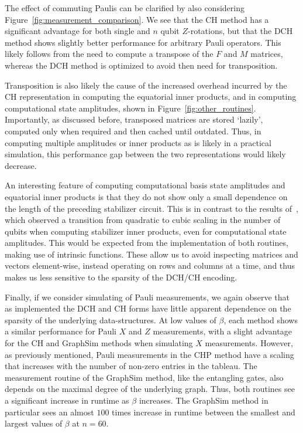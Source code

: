 The effect of commuting Paulis can be clarified by also considering Figure~\ref{fig:measurement_comparison}. We see that the CH method has a significant advantage for both single and $n$ qubit $Z$-rotations, but that the DCH method shows slightly better performance for arbitrary Pauli operators. This likely follows from the need to compute a transpose of the $F$ and $M$ matrices, whereas the DCH method is optimized to avoid then need for transposition.\par
Transposition is also likely the cause of the increased overhead incurred by the CH representation in computing the equatorial inner products, and in computing computational state amplitudes, shown in Figure~\ref{fig:other_routines}. Importantly, as discussed before, transposed matrices are stored `lazily', computed only when required and then cached until outdated. Thus, in computing multiple amplitudes or inner products as is likely in a practical simulation, this performance gap between the two representations would likely decrease.\par
An interesting feature of computing computational basis state amplitudes and equatorial inner products is that they do not show only a small dependence on the length of the preceding stabilizer circuit. This is in contrast to the results of~\cite{Garcia2012}, which observed a transition from quadratic to cubic scaling in the number of qubits when computing stabilizer inner products, even for computational state amplitudes. This would be expected from the implementation of both routines, making use of intrinsic functions. These allow us to avoid inspecting matrices and vectors element-wise, instead operating on rows and columns at a time, and thus makes us less sensitive to the sparsity of the DCH/CH encoding.\par 
Finally, if we consider simulating of Pauli measurements, we again observe that as implemented the DCH and CH forms have little apparent dependence on the sparsity of the underlying data-structures. At low values of $\beta$, each method shows a similar performance for Pauli $X$ and $Z$ measurements, with a slight advantage for the CH and GraphSim methods when simulating $X$ measurements. However, as previously mentioned, Pauli measurements in the CHP method have a scaling that increases with the number of non-zero entries in the tableau. The measurement routine of the GraphSim method, like the entangling gates, also depends on the maximal degree of the underlying graph. Thus, both routines see a significant increase in runtime as $\beta$ increases. The GraphSim method in particular sees an almost $100$ times increase in runtime between the smallest and largest values of $\beta$ at $n=60$.\par
